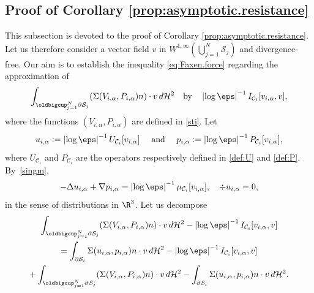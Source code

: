 \subsection{Proof of Corollary \ref{prop:asymptotic.resistance}}
\label{sec-prop:asymptotic.resistance}
This subsection is devoted to the proof of Corollary \ref{prop:asymptotic.resistance}.
Let us therefore consider a vector field $v $ in $W^{1,\infty}(\bigcup_{j=1}^N \mathcal S_j)$ and divergence-free.
Our aim is to establish the inequality \eqref{eq:Faxen.force}
regarding the approximation of
\begin{equation}
\int_{\oldbigcup_{j=1}^N \partial \mathcal S_j} (\Sigma (V_{i,\alpha}, P_{i,\alpha}) n) \cdot v \, d\mathcal{H}^2 \quad \text{by} \quad
\left|\log \eps\right|^{-1}
I_{\mathcal{C}_i } [v_{i,\alpha}, v], \end{equation}
where the functions $(V_{i,\alpha},P_{i,\alpha})$ are defined in \eqref{sti}.
Let
\begin{equation}
u_{i,\alpha} := \left|\log \eps\right|^{-1} U_{\mathcal C_i}[v_{i,\alpha}] \quad \text{ and } \quad
p_{i,\alpha} := \left|\log \eps\right|^{-1} P_{\mathcal C_i}[v_{i,\alpha}],
\end{equation}
where $U_{\mathcal C_i}$ and $P_{\mathcal C_i}$ are the operators respectively defined in \eqref{def:U} and \eqref{def:P}. By~\eqref{singm},
\begin{equation}
\label{dela}
-\Delta u_{i,\alpha} + \nabla p_{i,\alpha} = \left|\log \eps\right|^{-1} \mu_{\mathcal C_i}[v_{i,\alpha}], \quad \div u_{i,\alpha} = 0,
\end{equation}
in the sense of distributions in $\R^3$.
Let us decompose
\begin{multline}
\label{decompos}
\int_{\oldbigcup_{j=1}^N \partial \mathcal S_j} (\Sigma (V_{i,\alpha}, P_{i,\alpha}) n) \cdot v \, d\mathcal{H}^2 - \left|\log \eps\right|^{-1}
I_{\mathcal{C}_i } [v_{i,\alpha}, v]
\\
= \int_{\partial \mathcal S_{i}} \Sigma(u_{i,\alpha},p_{i,\alpha}) n \cdot v \, d\mathcal{H}^2
- \left|\log \eps\right|^{-1} I_{\mathcal{C}_i } [v_{i,\alpha},v]
\\ + \int_{\oldbigcup_{j=1}^N \partial \mathcal S_j} (\Sigma (V_{i,\alpha}, P_{i,\alpha}) n) \cdot v \, d\mathcal{H}^2 - \int_{\partial \mathcal S_{i}} \Sigma(u_{i,\alpha},p_{i,\alpha}) n \cdot v \, d\mathcal{H}^2.
\end{multline}

